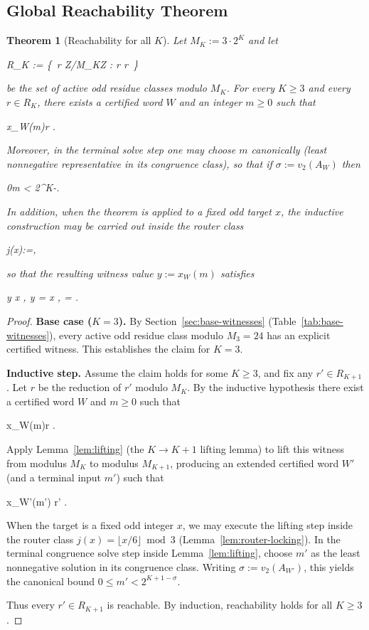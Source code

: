 \documentclass[11pt,letterpaper]{amsart}
\def\mathcal#1{#1}%
\def\mathbb#1{#1}%
\def\[{ }%
\def\]{ }%
\theoremstyle{definition}
\theoremstyle{plain}
\newtheorem{theorem}{Theorem}
\theoremstyle{plain}
\theoremstyle{remark}
\begin{document}
\subsection{Global Reachability Theorem}

\begin{theorem}[Reachability for all $K$]
\label{thm:reachability}
Let $M_K := 3\cdot 2^K$ and let
\[
\mathcal R_K := \{\, r \in \mathbb Z/M_K\mathbb Z : r  r\not{}  \,\}
\]
be the set of \emph{active odd} residue classes modulo $M_K$.
For every $K\ge 3$ and every $r\in \mathcal R_K$, there exists a certified word $W$
and an integer $m\ge 0$ such that
\[
x_W(m)\equiv r .
\]
Moreover, in the terminal solve step one may choose $m$ canonically (least nonnegative
representative in its congruence class), so that if $\sigma:=v_2(A_W)$ then
\[
0\le m < 2^{K-\sigma}.
\]
In addition, when the theorem is applied to a fixed odd target $x$, the inductive
construction may be carried out inside the router class
\[
j(x):=\left\lfloor {}\right\rfloor {},
\]
so that the resulting witness value $y:=x_W(m)$ satisfies
\[
y \equiv x ,
\qquad
y  = x ,
\qquad
\left\lfloor {}\right\rfloor {}
=
\left\lfloor {}\right\rfloor {}.
\]
\end{theorem}

\begin{proof}
\textbf{Base case ($K=3$).}
By Section~\ref{sec:base-witnesses} (Table~\ref{tab:base-witnesses}), every active odd residue
class modulo $M_3=24$ has an explicit certified witness. This establishes the claim for $K=3$.

\textbf{Inductive step.}
Assume the claim holds for some $K\ge 3$, and fix any $r'\in \mathcal R_{K+1}$.
Let $r$ be the reduction of $r'$ modulo $M_K$.
By the inductive hypothesis there exist a certified word $W$ and $m\ge 0$ such that
\[
x_W(m)\equiv r .
\]
Apply Lemma~\ref{lem:lifting} (the $K\to K{+}1$ lifting lemma) to lift this witness
from modulus $M_K$ to modulus $M_{K+1}$, producing an extended certified word $W'$
(and a terminal input $m'$) such that
\[
x_{W'}(m') \equiv r' .
\]
When the target is a fixed odd integer $x$, we may execute the lifting step inside the
router class $j(x)=\lfloor x/6\rfloor\bmod 3$ (Lemma~\ref{lem:router-locking}).
In the terminal congruence solve step inside Lemma~\ref{lem:lifting}, choose $m'$ as the
least nonnegative solution in its congruence class. Writing $\sigma:=v_2(A_{W'})$, this yields
the canonical bound $0\le m' < 2^{K+1-\sigma}$.

Thus every $r'\in\mathcal R_{K+1}$ is reachable. By induction, reachability holds for all
$K\ge 3$.
\end{proof}
\end{document}
